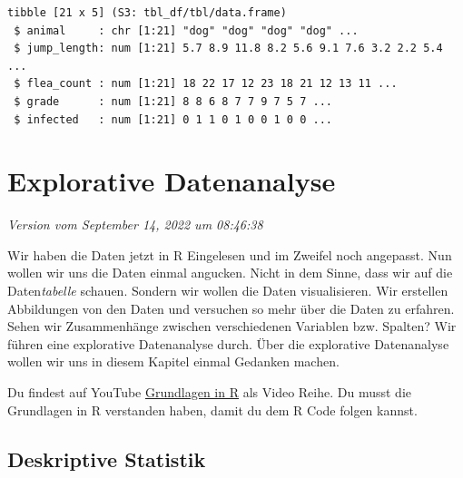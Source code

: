 \documentclass[
  letterpaper,
]{scrbook}
\begin{document}
\begin{verbatim}
tibble [21 x 5] (S3: tbl_df/tbl/data.frame)
 $ animal     : chr [1:21] "dog" "dog" "dog" "dog" ...
 $ jump_length: num [1:21] 5.7 8.9 11.8 8.2 5.6 9.1 7.6 3.2 2.2 5.4 ...
 $ flea_count : num [1:21] 18 22 17 12 23 18 21 12 13 11 ...
 $ grade      : num [1:21] 8 8 6 8 7 7 9 7 5 7 ...
 $ infected   : num [1:21] 0 1 1 0 1 0 0 1 0 0 ...
\end{verbatim}

\part{Explorative Datenanalyse}

\emph{Version vom September 14, 2022 um 08:46:38}

{}

Wir haben die Daten jetzt in R Eingelesen und im Zweifel noch angepasst.
Nun wollen wir uns die Daten einmal angucken. Nicht in dem Sinne, dass
wir auf die Daten\emph{tabelle} schauen. Sondern wir wollen die Daten
visualisieren. Wir erstellen Abbildungen von den Daten und versuchen so
mehr über die Daten zu erfahren. Sehen wir Zusammenhänge zwischen
verschiedenen Variablen bzw. Spalten? Wir führen eine explorative
Datenanalyse durch. Über die explorative Datenanalyse wollen wir uns in
diesem Kapitel einmal Gedanken machen.

\begin{tcolorbox}[enhanced jigsaw, coltitle=black, titlerule=0mm, bottomrule=.15mm, opacityback=0, opacitybacktitle=0.6, leftrule=.75mm, title=\textcolor{quarto-callout-tip-color}{\faLightbulb}\hspace{0.5em}{Einführung in R per Video}, toprule=.15mm, bottomtitle=1mm, toptitle=1mm, left=2mm, breakable, arc=.35mm, colback=white, rightrule=.15mm, colbacktitle=quarto-callout-tip-color!10!white, colframe=quarto-callout-tip-color-frame]
Du findest auf YouTube
\href{https://www.youtube.com/playlist?list=PLe51bCp9JvEFUnFqaJG5aRmON9i1ZbOYC}{Grundlagen
in R} als Video Reihe. Du musst die Grundlagen in R verstanden haben,
damit du dem R Code folgen kannst.
\end{tcolorbox}

\hypertarget{sec-desc-stat}{%
\chapter{Deskriptive Statistik}\label{sec-desc-stat}}
\end{document}
